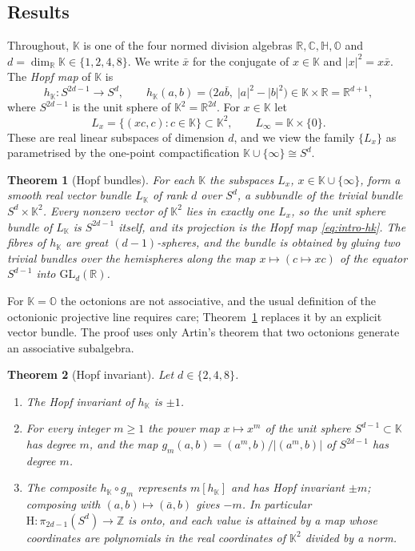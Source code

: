 \documentclass[11pt]{amsart}
\numberwithin{equation}{section}
\theoremstyle{plain}
\newtheorem{maintheorem}{Theorem}
\theoremstyle{definition}
\theoremstyle{remark}
\newcommand{\R}{\mathbb{R}}
\newcommand{\C}{\mathbb{C}}
\newcommand{\Hq}{\mathbb{H}}
\newcommand{\Oc}{\mathbb{O}}
\newcommand{\K}{\mathbb{K}}
\newcommand{\Z}{\mathbb{Z}}
\newcommand{\Hopf}{\mathrm{H}}
\begin{document}
\subsection{Results}

Throughout, $\K$ is one of the four normed division algebras $\R,\C,\Hq,\Oc$ and $d=\dim_\R\K\in\{1,2,4,8\}$. We write $\bar x$ for the conjugate of $x\in\K$ and $|x|^2=x\bar x$. The \emph{Hopf map} of $\K$ is
\begin{equation}\label{eq:intro-hk}
h_\K\colon S^{2d-1}\to S^d,\qquad h_\K(a,b)=\bigl(2a\bar b,\;|a|^2-|b|^2\bigr)\in\K\times\R=\R^{d+1},
\end{equation}
where $S^{2d-1}$ is the unit sphere of $\K^2=\R^{2d}$. For $x\in\K$ let
\[
L_x=\{(xc,c):c\in\K\}\subset\K^2,\qquad L_\infty=\K\times\{0\}.
\]
These are real linear subspaces of dimension $d$, and we view the family $\{L_x\}$ as parametrised by the one-point compactification $\K\cup\{\infty\}\cong S^d$.

\begin{maintheorem}[Hopf bundles]\label{thm:A}
For each $\K$ the subspaces $L_x$, $x\in\K\cup\{\infty\}$, form a smooth real vector bundle $L_\K$ of rank $d$ over $S^d$, a subbundle of the trivial bundle $S^d\times\K^2$. Every nonzero vector of $\K^2$ lies in exactly one $L_x$, so the unit sphere bundle of $L_\K$ is $S^{2d-1}$ itself, and its projection is the Hopf map \eqref{eq:intro-hk}. The fibres of $h_\K$ are great $(d-1)$-spheres, and the bundle is obtained by gluing two trivial bundles over the hemispheres along the map $x\mapsto(c\mapsto xc)$ of the equator $S^{d-1}$ into $\mathrm{GL}_d(\R)$.
\end{maintheorem}

For $\K=\Oc$ the octonions are not associative, and the usual definition of the octonionic projective line requires care; Theorem~\ref{thm:A} replaces it by an explicit vector bundle. The proof uses only Artin's theorem that two octonions generate an associative subalgebra.

\begin{maintheorem}[Hopf invariant]\label{thm:B}
Let $d\in\{2,4,8\}$.
\begin{enumerate}[label=\textup{(\roman*)}]
\item The Hopf invariant of $h_\K$ is $\pm1$.
\item For every integer $m\ge1$ the power map $x\mapsto x^m$ of the unit sphere $S^{d-1}\subset\K$ has degree $m$, and the map $g_m(a,b)=(a^m,b)/|(a^m,b)|$ of $S^{2d-1}$ has degree $m$.
\item The composite $h_\K\circ g_m$ represents $m[h_\K]$ and has Hopf invariant $\pm m$; composing with $(a,b)\mapsto(\bar a,b)$ gives $-m$. In particular $\Hopf\colon\pi_{2d-1}(S^d)\to\Z$ is onto, and each value is attained by a map whose coordinates are polynomials in the real coordinates of $\K^2$ divided by a norm.
\end{enumerate}
\end{maintheorem}
\end{document}
